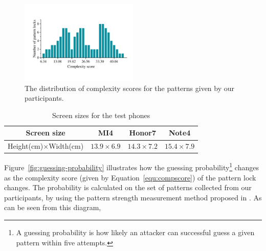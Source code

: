         \begin{figure}[!t]
            \centering
            \includegraphics[width=0.5\textwidth]{fig/pattern-strength.pdf}
            \caption{The distribution of complexity scores for the patterns given by our participants.}
            \label{fig:pattern-strength}
        \end{figure}

    \begin{table}[!t]
            \centering
            \caption{Screen sizes for the test phones}
            \label{tab:locking-screen-size}
            \small
            \begin{tabular}{cccc}
                \toprule
                \textbf{Screen size} & \textbf{MI4} & \textbf{Honor7} & \textbf{Note4} \\
                \midrule
                Height(cm)$\times$Width(cm) & $13.9\times6.9$ & $14.3\times7.2$ & $15.4\times7.9$ \\
                \bottomrule
            \end{tabular}
    \end{table}

    Figure~\ref{fig:guessing-probability} illustrates how the guessing probability\footnote{A guessing probability is
    how likely an attacker can successful guess a given pattern within five attempts.} changes as the complexity score (given by Equation~\ref{equ:compscore}) of the pattern lock changes.
    The probability is calculated on the set of patterns collected from our participants, by using the pattern strength
    measurement method proposed in \cite{Heidt2016Refining}. As can be seen from this diagram,

